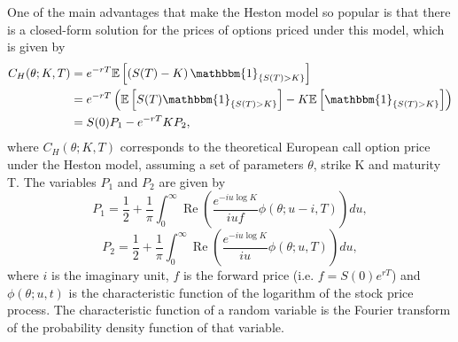 One of the main advantages that make the Heston model so popular is that there is a closed-form solution for the prices of options priced under this model, which is given by
\begin{equation}\label{CH}
\begin{split}
C_{H}(\theta;K,T)&=e^{-rT}\mathbb{E}\left[\left(S(T)-K\right)\mathbbm{1}_{\left\{S(T)>K\right\}}\right]\\
&=e^{-rT}\left(\mathbb{E}\left[S(T)\mathbbm{1}_{\left\{S(T)>K\right\}}\right]-K\mathbb{E}\left[\mathbbm{1}_{\left\{S(T)>K\right\}}\right]\right)\\
&=S(0)P_1-e^{-rT}KP_2,
\end{split}
\end{equation}
\noindent where $C_{H}(\theta;K,T)$ corresponds to the theoretical European call option price under the Heston model, assuming a set of parameters $\theta$, strike K and maturity T. The variables $P_1$ and $P_2$ are given by
\begin{equation}\label{P1}
P_1=\frac{1}{2}+\frac{1}{\pi}\int_0^\infty\operatorname{Re}\left(\frac{e^{-iu\log K}}{iuf}\phi(\theta;u-i,T)\right)du,
\end{equation}
\begin{equation}\label{P2}
P_2=\frac{1}{2}+\frac{1}{\pi}\int_0^\infty\operatorname{Re}\left(\frac{e^{-iu\log K}}{iu}\phi(\theta;u,T)\right)du,
\end{equation}
\noindent where $i$ is the imaginary unit, $f$ is the forward price (i.e. $f=S(0)e^{rT}$) and $\phi(\theta;u,t)$ is the characteristic function of the logarithm of the stock price process. The characteristic function of a random variable is the Fourier transform of the probability density function of that variable.

